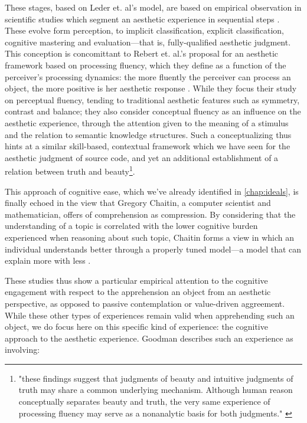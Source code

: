 These stages, based on Leder et. al's model, are based on empirical observation in scientific studies which segment an aesthetic experience in sequential steps \citep{leder_model_2004}. These evolve form perception, to implicit classification, explicit classification, cognitive mastering and evaluation—that is, fully-qualified aesthetic judgment. This conception is concomittant to Rebert et. al.'s proposal for an aesthetic framework based on processing fluency, which they define as a function of the perceiver's processing dynamics: the more fluently the perceiver can process an object, the more positive is her aesthetic response \citep{reber_processing_2004}. While they focus their study on perceptual fluency, tending to traditional aesthetic features such as symmetry, contrast and balance; they also consider conceptual fluency as an influence on the aesthetic experience, through the attention given to the meaning of a stimulus and the relation to semantic knowledge structures. Such a conceptualizing thus hints at a similar skill-based, contextual framework which we have seen for the aesthetic judgment of source code, and yet an additional establishment of a relation between truth and beauty\footnote{"these findings suggest that judgments of beauty and intuitive judgments of truth may share a common underlying mechanism. Although human reason conceptually separates beauty and truth, the very same experience of processing fluency may serve as a nonanalytic basis for both judgments." \citep{reber_processing_2004}}.

This approach of cognitive ease, which we've already identified in \ref{chap:ideals}, is finally echoed in the view that Gregory Chaitin, a computer scientist and mathematician, offers of comprehension as compression. By considering that the understanding of a topic is correlated with the lower cognitive burden experienced when reasoning about such topic, Chaitin forms a view in which an individual understands better through a properly tuned model—a model that can explain more with less \citep{zenil_compression_2021}.

These studies thus show a particular empirical attention to the cognitive engagement with respect to the apprehension an object from an aesthetic perspective, as opposed to passive contemplation or value-driven aggreement. While these other types of experiences remain valid when apprehending such an object, we do focus here on this specific kind of experience: the cognitive approach to the aesthetic experience. Goodman describes such an experience as involving:

